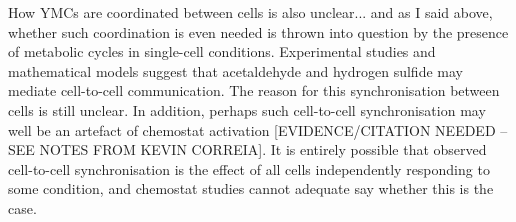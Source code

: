 How YMCs are coordinated between cells is also unclear... and as I said above, whether such coordination is even needed is thrown into question by the presence of metabolic cycles in single-cell conditions.
Experimental studies \citep{murrayRegulationYeastOscillatory2007} and mathematical models
\citep{krishnaMinimalPushPull2018} suggest that acetaldehyde and hydrogen sulfide may mediate cell-to-cell communication.
The reason for this synchronisation between cells is still unclear. %
In addition, perhaps such cell-to-cell synchronisation may well be an artefact of chemostat activation [EVIDENCE/CITATION NEEDED -- SEE NOTES FROM KEVIN CORREIA].
It is entirely possible that observed cell-to-cell synchronisation is the effect of all cells independently responding to some condition, and chemostat studies cannot adequate say whether this is the case.
